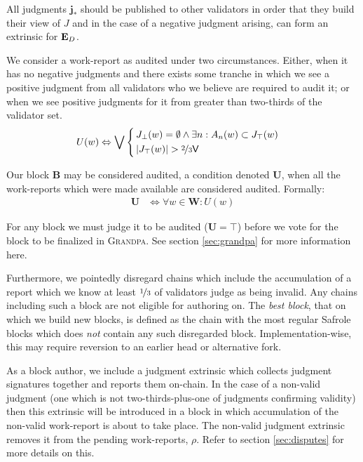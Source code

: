 All judgments $\mathbf{j}_*$ should be published to other validators in order that they build their view of $J$ and in the case of a negative judgment arising, can form an extrinsic for $\mathbf{E}_D$.

We consider a work-report as audited under two circumstances. Either, when it has no negative judgments and there exists some tranche in which we see a positive judgment from all validators who we believe are required to audit it; or when we see positive judgments for it from greater than two-thirds of the validator set.
\begin{align}
  U(w) &\Leftrightarrow \bigvee\,\left\{\,\begin{aligned}
      &J_\bot(w) = \emptyset \wedge \exists n : A_n(w) \subset J_\top(w) \\
      &|J_\top(w)| > \nicefrac{2}{3}\mathsf{V}
  \end{aligned}\right.
\end{align}

Our block $\mathbf{B}$ may be considered audited, a condition denoted $\mathbf{U}$, when all the work-reports which were made available are considered audited. Formally:
\begin{align}
  \mathbf{U} &\Leftrightarrow \forall w \in \mathbf{W} : U(w)
\end{align}

For any block we must judge it to be audited (\ie $\mathbf{U} = \top$) before we vote for the block to be finalized in \textsc{Grandpa}. See section \ref{sec:grandpa} for more information here.

Furthermore, we pointedly disregard chains which include the accumulation of a report which we know at least $\nicefrac{1}{3}$ of validators judge as being invalid. Any chains including such a block are not eligible for authoring on. The \emph{best block}, \ie that on which we build new blocks, is defined as the chain with the most regular Safrole blocks which does \emph{not} contain any such disregarded block. Implementation-wise, this may require reversion to an earlier head or alternative fork.

As a block author, we include a judgment extrinsic which collects judgment signatures together and reports them on-chain. In the case of a non-valid judgment (\ie one which is not two-thirds-plus-one of judgments confirming validity) then this extrinsic will be introduced in a block in which accumulation of the non-valid work-report is about to take place. The non-valid judgment extrinsic removes it from the pending work-reports, $\rho$. Refer to section \ref{sec:disputes} for more details on this.

